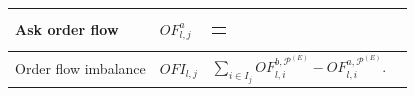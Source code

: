 \documentclass[10pt,a4paper,oneside]{article}
\makeatletter
\providecommand{\DIFaddtex}[1]{{\protect\color{blue}\uwave{#1}}} %
\providecommand{\DIFdeltex}[1]{{\protect\color{red}\sout{#1}}} %
\providecommand{\DIFaddbegin}{} %
\providecommand{\DIFaddend}{} %
\providecommand{\DIFdelbegin}{} %
\providecommand{\DIFdelend}{} %
\providecommand{\DIFadd}[1]{\texorpdfstring{\DIFaddtex{#1}}{#1}} %
\providecommand{\DIFdel}[1]{\texorpdfstring{\DIFdeltex{#1}}{}} %
\newcommand{\DIFscaledelfig}{0.5}
\newlength{\DIFdelgraphicswidth} %
\newlength{\DIFdelgraphicsheight} %
\newcommand{\DIFaddincludegraphics}[2][]{{\color{blue}\fbox{\DIFOincludegraphics[#1]{#2}}}} %
\newcommand{\DIFdelincludegraphics}[2][]{%
\sbox{\DIFdelgraphicsbox}{\DIFOincludegraphics[#1]{#2}}%
\settoboxwidth{\DIFdelgraphicswidth}{\DIFdelgraphicsbox} %
\settoboxtotalheight{\DIFdelgraphicsheight}{\DIFdelgraphicsbox} %
\scalebox{\DIFscaledelfig}{%
\parbox[b]{\DIFdelgraphicswidth}{\usebox{\DIFdelgraphicsbox}\\[-\baselineskip] \rule{\DIFdelgraphicswidth}{0em}}\llap{\resizebox{\DIFdelgraphicswidth}{\DIFdelgraphicsheight}{%
\setlength{\unitlength}{\DIFdelgraphicswidth}%
\begin{picture}(1,1)%
\thicklines\linethickness{2pt} %
{\color[rgb]{1,0,0}\put(0,0){\framebox(1,1){}}}%
{\color[rgb]{1,0,0}\put(0,0){\line( 1,1){1}}}%
{\color[rgb]{1,0,0}\put(0,1){\line(1,-1){1}}}%
\end{picture}%
}\hspace*{3pt}}} %
} %
\DeclareRobustCommand{\DIFaddbegin}{\DIFOaddbegin \let\includegraphics\DIFaddincludegraphics} %
\DeclareRobustCommand{\DIFaddend}{\DIFOaddend \let\includegraphics\DIFOincludegraphics} %
\DeclareRobustCommand{\DIFdelbegin}{\DIFOdelbegin \let\includegraphics\DIFdelincludegraphics} %
\DeclareRobustCommand{\DIFdelend}{\DIFOaddend \let\includegraphics\DIFOincludegraphics} %
\let\sout@orig\sout %
\renewcommand{\sout}[1]{\ifmmode\text{\sout@orig{\ensuremath{#1}}}\else\sout@orig{#1}\fi} %
\makeatother
\begin{document}
\begin{longtable}{|p{4cm}|p{2.25cm}|p{5.25cm}|p{2.25cm}|}
    Ask order flow                                                                                                                                                         &
    $OF^a_{l, j}$                                                                                                                                                          &
    \begin{tabular}[t]{@{}l@{}}\DIFdelbegin \DIFdel{%
\mbox{%
$\begin{cases} v^a_{l, j} & p^a_{l, j} < p^a_{l, j - 1}, \\ 
v^a_{l, j} - v^a_{l, j - 1} & p^a_{l, j} = p^a_{l, j - 1}, \\ 
-v^a_{l, j -1} & p^a_{l, j} > p^a_{l, j - 1}. \end{cases}$
}%
}\DIFdelend \DIFaddbegin \DIFadd{%
\mbox{%
$\begin{cases} v^a_{l, j}                  & p^a_{l, j} < p^a_{l, j - 1}, \\
              v^a_{l, j} - v^a_{l, j - 1} & p^a_{l, j} = p^a_{l, j - 1}, \\
              -v^a_{l, j -1}              & p^a_{l, j} > p^a_{l, j - 1}.\end{cases}$
}%
}\DIFaddend \end{tabular}                                                                                                   &
    \cite{cont2013price, kolm2023deep}                                                                                                                                                                                                                                                                                                                                                         \\ \hline

    Order flow imbalance                                                                                                                                                   &
    $OFI_{l, j}$                                                                                                                                                           &
    $\sum_{i \in I_j} OF^{b, \mathcal{P}^{(E)}}_{l,i} - OF^{a, \mathcal{P}^{(E)}}_{l,i}$.                                                                                  &
    \cite{cont2013price, kolm2023deep}                                                                                                                                                                                                                                                                                                                                                         \\ \hline


\end{longtable}
\end{document}
